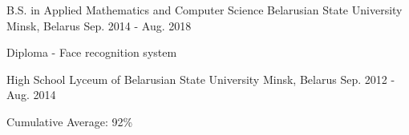 

\begin{cventries}

  \cventry
    {B.S. in Applied Mathematics and Computer Science} %
    {Belarusian State University} %
    {Minsk, Belarus} %
    {Sep. 2014 - Aug. 2018} %
    {
      \begin{cvitems} %
        \item {Diploma - Face recognition system}
      \end{cvitems}
    }

  \cventry
    {High School} %
    {Lyceum of Belarusian State University} %
    {Minsk, Belarus} %
    {Sep. 2012 - Aug. 2014} %
    {
      \begin{cvitems} %
        \item {Cumulative Average: 92\%}
      \end{cvitems}
    }
\end{cventries}
